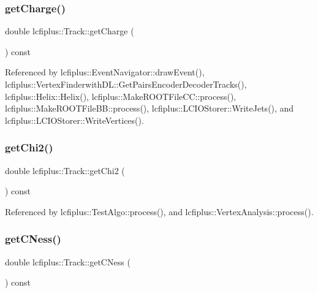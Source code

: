 \subsubsection{get\+Charge()}
{\footnotesize\ttfamily double lcfiplus\+::\+Track\+::get\+Charge (\begin{DoxyParamCaption}{ }\end{DoxyParamCaption}) const\hspace{0.3cm}{\ttfamily [inline]}}



Referenced by lcfiplus\+::\+Event\+Navigator\+::draw\+Event(), lcfiplus\+::\+Vertex\+Finderwith\+D\+L\+::\+Get\+Pairs\+Encoder\+Decoder\+Tracks(), lcfiplus\+::\+Helix\+::\+Helix(), lcfiplus\+::\+Make\+R\+O\+O\+T\+File\+C\+C\+::process(), lcfiplus\+::\+Make\+R\+O\+O\+T\+File\+B\+B\+::process(), lcfiplus\+::\+L\+C\+I\+O\+Storer\+::\+Write\+Jets(), and lcfiplus\+::\+L\+C\+I\+O\+Storer\+::\+Write\+Vertices().

\mbox{\label{classlcfiplus_1_1Track_a126e6489396585aaf8967d0371deb22c}} 
\subsubsection{get\+Chi2()}
{\footnotesize\ttfamily double lcfiplus\+::\+Track\+::get\+Chi2 (\begin{DoxyParamCaption}{ }\end{DoxyParamCaption}) const\hspace{0.3cm}{\ttfamily [inline]}}



Referenced by lcfiplus\+::\+Test\+Algo\+::process(), and lcfiplus\+::\+Vertex\+Analysis\+::process().

\mbox{\label{classlcfiplus_1_1Track_a8ee3a73f3f540db5925b430e962d8f24}} 
\subsubsection{get\+C\+Ness()}
{\footnotesize\ttfamily double lcfiplus\+::\+Track\+::get\+C\+Ness (\begin{DoxyParamCaption}{ }\end{DoxyParamCaption}) const\hspace{0.3cm}{\ttfamily [inline]}}

